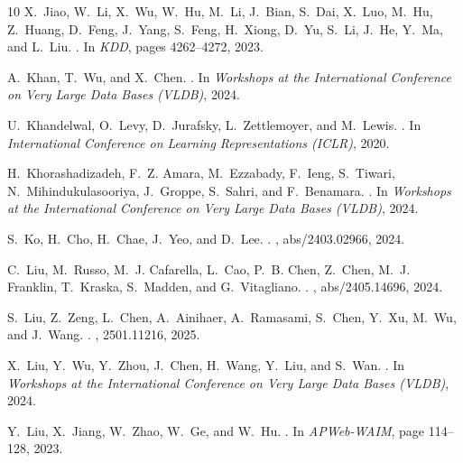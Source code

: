 \documentclass{sig-alternate-10pt}
\begin{document}
\begin{small}
\begin{thebibliography}{10}
X.~Jiao, W.~Li, X.~Wu, W.~Hu, M.~Li, J.~Bian, S.~Dai, X.~Luo, M.~Hu, Z.~Huang, D.~Feng, J.~Yang, S.~Feng, H.~Xiong, D.~Yu, S.~Li, J.~He, Y.~Ma, and L.~Liu.
.
\newblock In {\em KDD}, pages 4262--4272, 2023.

A.~Khan, T.~Wu, and X.~Chen.
.
\newblock In {\em Workshops at the International Conference on Very Large Data Bases {(VLDB)}}, 2024.

U.~Khandelwal, O.~Levy, D.~Jurafsky, L.~Zettlemoyer, and M.~Lewis.
.
\newblock In {\em International Conference on Learning Representations (ICLR)}, 2020.

H.~Khorashadizadeh, F.~Z. Amara, M.~Ezzabady, F.~Ieng, S.~Tiwari, N.~Mihindukulasooriya, J.~Groppe, S.~Sahri, and F.~Benamara.
.
\newblock In {\em Workshops at the International Conference on Very Large Data Bases (VLDB)}, 2024.

S.~Ko, H.~Cho, H.~Chae, J.~Yeo, and D.~Lee.
.
, abs/2403.02966, 2024.

C.~Liu, M.~Russo, M.~J. Cafarella, L.~Cao, P.~B. Chen, Z.~Chen, M.~J. Franklin, T.~Kraska, S.~Madden, and G.~Vitagliano.
.
, abs/2405.14696, 2024.

S.~Liu, Z.~Zeng, L.~Chen, A.~Ainihaer, A.~Ramasami, S.~Chen, Y.~Xu, M.~Wu, and J.~Wang.
.
, 2501.11216, 2025.

X.~Liu, Y.~Wu, Y.~Zhou, J.~Chen, H.~Wang, Y.~Liu, and S.~Wan.
.
\newblock In {\em Workshops at the International Conference on Very Large Data Bases (VLDB)}, 2024.

Y.~Liu, X.~Jiang, W.~Zhao, W.~Ge, and W.~Hu.
.
\newblock In {\em APWeb-WAIM}, page 114–128, 2023.


\end{thebibliography}
\end{small}
\end{document}
